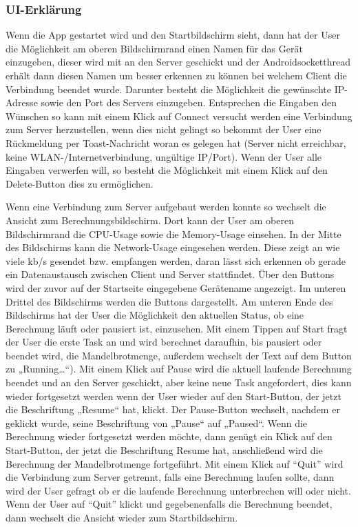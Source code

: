 \documentclass[12pt, onecolumn,notitlepage]{scrartcl}
\begin{document}
\subsubsection{UI-Erklärung}
Wenn die App gestartet wird und den Startbildschirm  sieht, dann hat der User die Möglichkeit am oberen Bildschirmrand einen Namen für das Gerät einzugeben, dieser wird mit an den Server geschickt und der Androidsocketthread erhält dann diesen Namen um besser erkennen zu können bei welchem Client die Verbindung beendet wurde. Darunter besteht die Möglichkeit die gewünschte IP-Adresse  sowie den Port  des Servers einzugeben. Entsprechen die Eingaben den Wünschen so kann mit einem Klick auf Connect   versucht werden eine Verbindung zum Server herzustellen, wenn dies nicht gelingt so bekommt der User eine Rückmeldung per Toast-Nachricht woran es gelegen hat (Server nicht erreichbar, keine WLAN-/Internetverbindung, ungültige IP/Port). Wenn der User alle Eingaben verwerfen will, so besteht die Möglichkeit mit einem Klick auf den Delete-Button  dies zu ermöglichen. \par
Wenn eine Verbindung zum Server aufgebaut werden konnte so wechselt die Ansicht zum Berechnungsbildschirm. Dort kann der User am oberen Bildschirmrand die CPU-Usage sowie die Memory-Usage einsehen. In der Mitte des Bildschirms kann die Network-Usage  eingesehen werden. Diese zeigt an wie viele kb/s gesendet bzw. empfangen werden, daran lässt sich erkennen ob gerade ein Datenaustausch zwischen Client und Server stattfindet. Über den Buttons wird der zuvor auf der Startseite eingegebene Gerätename angezeigt. Im unteren Drittel des Bildschirms werden die Buttons dargestellt. Am unteren Ende des Bildschirms hat der User die Möglichkeit den aktuellen Status, ob eine Berechnung läuft oder pausiert ist, einzusehen. Mit einem Tippen auf Start fragt der User die erste Task an und wird berechnet daraufhin, bis pausiert oder beendet wird, die Mandelbrotmenge, außerdem wechselt der Text auf dem Button zu „Running…“). Mit einem Klick auf Pause wird die aktuell laufende Berechnung beendet und an den Server geschickt, aber keine neue Task angefordert, dies kann wieder fortgesetzt werden wenn der User wieder auf den Start-Button, der jetzt die Beschriftung „Resume“ hat, klickt. Der Pause-Button wechselt, nachdem er geklickt wurde, seine Beschriftung von „Pause“ auf „Paused“. Wenn die Berechnung wieder fortgesetzt werden möchte, dann genügt ein Klick auf den Start-Button, der jetzt die Beschriftung Resume hat, anschließend wird die Berechnung der Mandelbrotmenge fortgeführt. Mit einem Klick auf \enquote{Quit} wird die Verbindung zum Server getrennt, falls eine Berechnung laufen sollte, dann wird der User gefragt ob er die laufende Berechnung unterbrechen will oder nicht. Wenn der User auf \enquote{Quit} klickt und gegebenenfalls die Berechnung beendet, dann wechselt die Ansicht wieder zum Startbildschirm.
\end{document}
